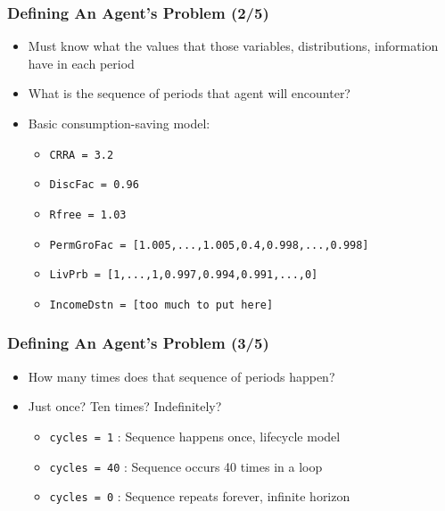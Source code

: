 \documentclass[11pt,handout]{beamer}
\newcommand{\bi}{\begin{itemize}}
\newcommand{\ei}{\end{itemize}}
\begin{document}
\begin{frame}
\frametitle{Defining An Agent's Problem (2/5)}
\bi
\item <1->Must know what the values that those variables, distributions, information have in each period

\item <1->What is the sequence of periods that agent will encounter?

\item <2->Basic consumption-saving model:
\bi
\item \texttt{CRRA = 3.2}

\item \texttt{DiscFac = 0.96}

\item \texttt{Rfree = 1.03}

\item \texttt{PermGroFac = [1.005,...,1.005,0.4,0.998,...,0.998]}

\item \texttt{LivPrb = [1,...,1,0.997,0.994,0.991,...,0]}

\item \texttt{IncomeDstn = [too much to put here]}
\ei
\ei
\end{frame}



\begin{frame}
\frametitle{Defining An Agent's Problem (3/5)}
\bi
\item <1->How many times does that sequence of periods happen?

\item <1->Just once?  Ten times?  Indefinitely?
\bi
\item \texttt{cycles = 1} : Sequence happens once, lifecycle model

\item \texttt{cycles = 40} : Sequence occurs 40 times in a loop

\item \texttt{cycles = 0} : Sequence repeats forever, infinite horizon
\ei
\ei
\end{frame}
\end{document}
